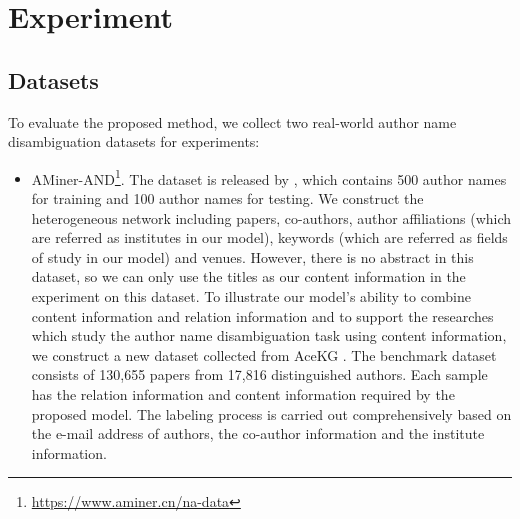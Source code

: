 \documentclass[letterpaper]{article} %
\begin{document}
\section{Experiment}
\subsection{Datasets}
To evaluate the proposed method, we collect two real-world author name disambiguation datasets for experiments:
\begin{itemize}
\item AMiner-AND\footnote{\small \url{https://www.aminer.cn/na-data}}. 
The dataset is released by \cite{JieTang}, which contains 500 author names for training and 100 author names for testing. We construct the heterogeneous network including papers, co-authors, author affiliations (which are referred as institutes in our model), keywords (which are referred as fields of study in our model) and venues. However, there is no abstract in this dataset, so we can only use the titles as our content information in the experiment on this dataset.  
To illustrate our model's ability to combine content information and relation information and to support the researches which study the author name disambiguation task using content information, we construct a new dataset collected from AceKG \cite{AceKG}. The benchmark dataset consists of 130,655 papers from 17,816 distinguished authors. Each sample has the relation information and content information required by the proposed model. The labeling process is carried out comprehensively based on the e-mail address of authors, the co-author information and the institute information. 
\end{itemize}
\end{document}

